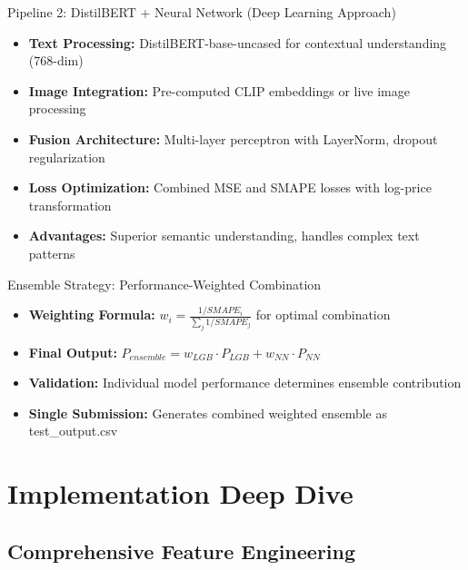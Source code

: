 \documentclass[10pt,a4paper]{article}
\begin{document}
\vspace{0.3cm}

\begin{techbox}{Pipeline 2: DistilBERT + Neural Network (Deep Learning Approach)}
\begin{itemize}[itemsep=0.2em]
    \item \textbf{Text Processing:} DistilBERT-base-uncased for contextual understanding (768-dim)
    \item \textbf{Image Integration:} Pre-computed CLIP embeddings or live image processing
    \item \textbf{Fusion Architecture:} Multi-layer perceptron with LayerNorm, dropout regularization
    \item \textbf{Loss Optimization:} Combined MSE and SMAPE losses with log-price transformation
    \item \textbf{Advantages:} Superior semantic understanding, handles complex text patterns
\end{itemize}
\end{techbox}

\vspace{0.3cm}

\begin{techbox}{Ensemble Strategy: Performance-Weighted Combination}
\begin{itemize}[itemsep=0.2em]
    \item \textbf{Weighting Formula:} $w_i = \frac{1/SMAPE_i}{\sum_j 1/SMAPE_j}$ for optimal combination
    \item \textbf{Final Output:} $P_{ensemble} = w_{LGB} \cdot P_{LGB} + w_{NN} \cdot P_{NN}$
    \item \textbf{Validation:} Individual model performance determines ensemble contribution
    \item \textbf{Single Submission:} Generates combined weighted ensemble as test\_output.csv
\end{itemize}
\end{techbox}

\section{\textcolor{primarycolor}{Implementation Deep Dive}}

\subsection{Comprehensive Feature Engineering}
\end{document}
